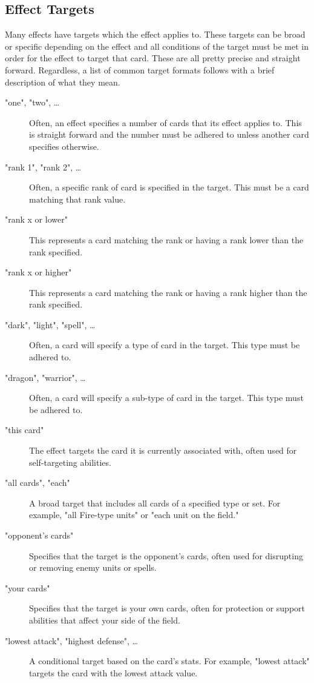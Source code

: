     

  
  


\subsection{Effect Targets}
Many effects have targets which the effect applies to. These targets can be broad or specific depending on the effect and all conditions of the target must be met in order for the effect to target that card. These are all pretty precise and straight forward. Regardless, a list of common target formats follows with a brief description of what they mean.
\begin{description}
	\item["one", "two", \dots] Often, an effect specifies a number of cards that its effect applies to. This is straight forward and the number must be adhered to unless another card specifies otherwise.
	\item["rank 1", "rank 2", \dots] Often, a specific rank of card is specified in the target. This must be a card matching that rank value.
	\item["rank x or lower"] This represents a card matching the rank or having a rank lower than the rank specified. 
	\item["rank x or higher"]  This represents a card matching the rank or having a rank higher than the rank specified. 
	\item["dark", "light", "spell", \dots] Often, a card will specify a type of card in the target. This type must be adhered to.
	\item["dragon", "warrior", \dots] Often, a card will specify a sub-type of card in the target. This type must be adhered to.
	\item["this card"] The effect targets the card it is currently associated with, often used for self-targeting abilities.
	\item["all cards", "each"] A broad target that includes all cards of a specified type or set. For example, "all Fire-type units" or "each unit on the field."
	\item["opponent's cards"] Specifies that the target is the opponent's cards, often used for disrupting or removing enemy units or spells.
	\item["your cards"] Specifies that the target is your own cards, often for protection or support abilities that affect your side of the field.
	\item["lowest attack", "highest defense", \dots] A conditional target based on the card’s stats. For example, "lowest attack" targets the card with the lowest attack value.

\end{description}
